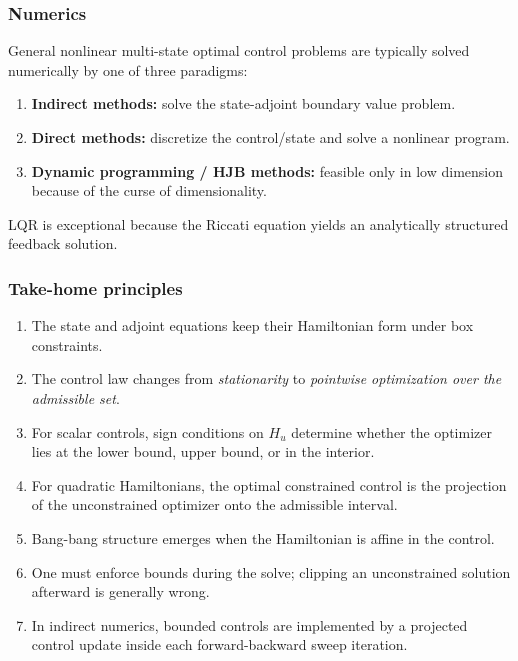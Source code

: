 \documentclass[11pt]{article}
\theoremstyle{definition}
\begin{document}
\subsubsection{Numerics}

General nonlinear multi-state optimal control problems are typically solved numerically by one of three paradigms:
\begin{enumerate}[label=(\alph*)]
    \item \textbf{Indirect methods:} solve the state-adjoint boundary value problem.
    \item \textbf{Direct methods:} discretize the control/state and solve a nonlinear program.
    \item \textbf{Dynamic programming / HJB methods:} feasible only in low dimension because of the curse of dimensionality.
\end{enumerate}
LQR is exceptional because the Riccati equation yields an analytically structured feedback solution.

\subsubsection{Take-home principles}

\begin{enumerate}[label=(\roman*)]
    \item The state and adjoint equations keep their Hamiltonian form under box constraints.
    \item The control law changes from \emph{stationarity} to \emph{pointwise optimization over the admissible set}.
    \item For scalar controls, sign conditions on $H_u$ determine whether the optimizer lies at the lower bound, upper bound, or in the interior.
    \item For quadratic Hamiltonians, the optimal constrained control is the projection of the unconstrained optimizer onto the admissible interval.
    \item Bang-bang structure emerges when the Hamiltonian is affine in the control.
    \item One must enforce bounds during the solve; clipping an unconstrained solution afterward is generally wrong.
    \item In indirect numerics, bounded controls are implemented by a projected control update inside each forward-backward sweep iteration.
\end{enumerate}
\end{document}
